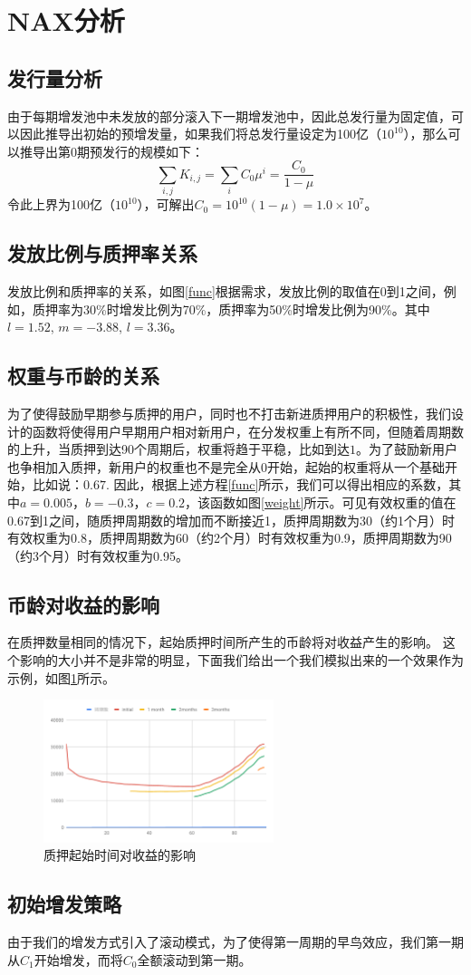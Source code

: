 \section{NAX分析}
\subsection{发行量分析}
由于每期增发池中未发放的部分滚入下一期增发池中，因此总发行量为固定值，可以因此推导出初始的预增发量，如果我们将总发行量设定为100亿（\(10^{10}\)），那么可以推导出第0期预发行的规模如下：
\begin{equation}
  \sum_{i,j} K_{i,j} = \sum_i C_0 \mu^i = \frac{C_0}{1-\mu}
\end{equation}
  令此上界为100亿（\(10^{10}\)），可解出\(C_0 = 10^{10}(1-\mu) = 1.0\times10^7\)。

\subsection{发放比例与质押率关系}
发放比例和质押率的关系，如图\ref{func}根据需求，发放比例的取值在0到1之间，例如，质押率为30\%时增发比例为70\%，质押率为50\%时增发比例为90\%。其中\(l=1.52\), \(m=-3.88\), \(l=3.36\)。

\subsection{权重与币龄的关系}
为了使得鼓励早期参与质押的用户，同时也不打击新进质押用户的积极性，我们设计的函数将使得用户早期用户相对新用户，在分发权重上有所不同，但随着周期数的上升，当质押到达90个周期后，权重将趋于平稳，比如到达$1$。为了鼓励新用户也争相加入质押，新用户的权重也不是完全从0开始，起始的权重将从一个基础开始，比如说：$0.67$. 因此，根据上述方程\ref{func}所示，我们可以得出相应的系数，其中\(a=0.005\)，\(b=-0.3\)，\(c=0.2\)，该函数如图\ref{weight}所示。可见有效权重的值在0.67到1之间，随质押周期数的增加而不断接近1，质押周期数为30（约1个月）时有效权重为0.8，质押周期数为60（约2个月）时有效权重为0.9，质押周期数为90（约3个月）时有效权重为0.95。

\subsection{币龄对收益的影响}
在质押数量相同的情况下，起始质押时间所产生的币龄将对收益产生的影响。 这个影响的大小并不是非常的明显，下面我们给出一个我们模拟出来的一个效果作为示例，如图\ref{fig:compare}所示。
\begin{figure}[htbp]
  \centering
    \includegraphics[width=0.6\textwidth]{../common/zh/compare.pdf}
    \caption{质押起始时间对收益的影响 \label{fig:compare}}
\end{figure}

\subsection{初始增发策略}
由于我们的增发方式引入了滚动模式，为了使得第一周期的早鸟效应，我们第一期从$C_1$开始增发，而将$C_0$全额滚动到第一期。

